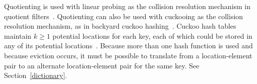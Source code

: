 \documentclass[letterpaper,twocolumn,10pt]{article}
\begin{document}



Quotienting is used with linear probing as the collision resolution mechanism in quotient filters~\cite{quotient-filter}.
Quotienting can also be used with cuckooing as the collision resolution mechanism, as in backyard cuckoo hashing~\cite{backyard}.
Cuckoo hash tables maintain $k \ge 1$ potential locations for each key, each of which could be stored in any of its potential locations~\cite{cuckoo-journal}.
Because more than one hash function is used and because eviction occurs, it must be possible to translate from a location-element pair to an alternate location-element pair for the same key.
See Section~\ref{dictionary}.


\end{document}
